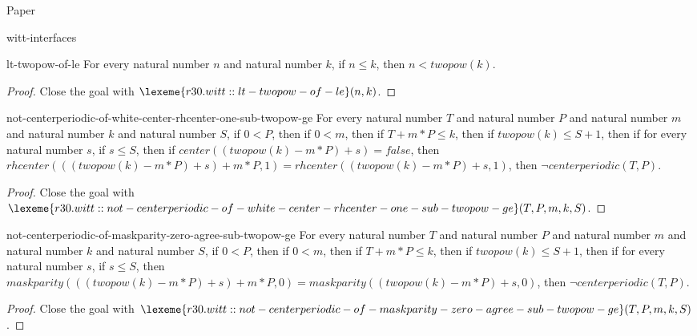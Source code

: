 \begin{lexlean}{Paper}
\begin{section}{witt-interfaces}
  \begin{theorem}{lt-twopow-of-le}
  For every natural number \(n\) and natural number \(k\), if \(n ≤ k\), then \(n < twopow(k)\).
  \begin{proof}
  Close the goal with \(\lexeme{r30.witt::lt-twopow-of-le}(n, k)\).
  \end{proof}
  \end{theorem}

  \begin{theorem}{not-centerperiodic-of-white-center-rhcenter-one-sub-twopow-ge}
  For every natural number \(T\) and natural number \(P\) and natural number \(m\) and natural number \(k\) and natural number \(S\), if \(0 < P\), then if \(0 < m\), then if \(T + m * P ≤ k\), then if \(twopow(k) ≤ S + 1\), then if for every natural number \(s\), if \(s ≤ S\), then if \(center((twopow(k) - m * P) + s) = false\), then \(rhcenter(((twopow(k) - m * P) + s) + m * P, 1) = rhcenter((twopow(k) - m * P) + s, 1)\), then \(¬ centerperiodic(T, P)\).
  \begin{proof}
  Close the goal with \(\lexeme{r30.witt::not-centerperiodic-of-white-center-rhcenter-one-sub-twopow-ge}(T, P, m, k, S)\).
  \end{proof}
  \end{theorem}

  \begin{theorem}{not-centerperiodic-of-maskparity-zero-agree-sub-twopow-ge}
  For every natural number \(T\) and natural number \(P\) and natural number \(m\) and natural number \(k\) and natural number \(S\), if \(0 < P\), then if \(0 < m\), then if \(T + m * P ≤ k\), then if \(twopow(k) ≤ S + 1\), then if for every natural number \(s\), if \(s ≤ S\), then \(maskparity(((twopow(k) - m * P) + s) + m * P, 0) = maskparity((twopow(k) - m * P) + s, 0)\), then \(¬ centerperiodic(T, P)\).
  \begin{proof}
  Close the goal with \(\lexeme{r30.witt::not-centerperiodic-of-maskparity-zero-agree-sub-twopow-ge}(T, P, m, k, S)\).
  \end{proof}
  \end{theorem}


\end{section}
\end{lexlean}
